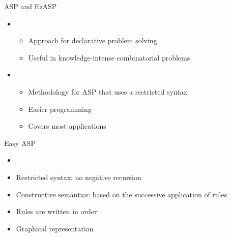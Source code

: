 \begin{frame}{ASP and EzASP}
\begin{itemize}
  \vfill
  \item<1->
  \begin{itemize}
    \item Approach for declarative problem solving
    \item Useful in knowledge-intense combinatorial problems
  \end{itemize}
  \bigskip
  \bigskip
  \item<2->
  \begin{itemize}
    \item Methodology for ASP that uses a \alert<2>{restricted syntax}
    \item Easier programming
    \item Covers most applications
  \end{itemize}
  \vfill
\end{itemize}
\end{frame}


\begin{frame}{Easy ASP}
\begin{itemize}
  \vfill
  \item<1->
  \item<2->Restricted syntax: no negative recursion
  \item<3->Constructive semantics: based on the successive application of rules
  \item<4->Rules are written in order
  \item<5->Graphical representation
\end{itemize}
\end{frame}


